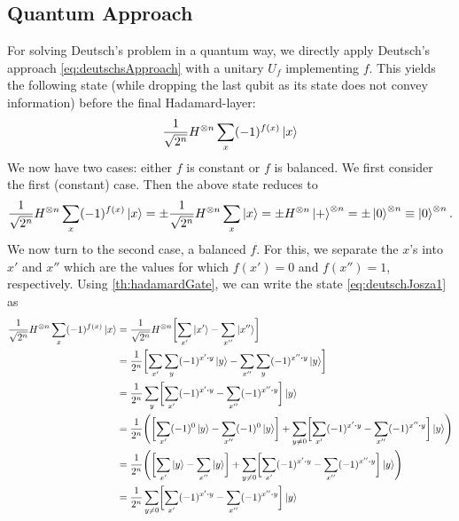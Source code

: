 		\subsection{Quantum Approach}
			For solving Deutsch's problem in a quantum way, we directly apply Deutsch's approach \eqref{eq:deutschsApproach} with a unitary \(U_f\) implementing \(f\). This yields the following state (while dropping the last qubit as its state does not convey information) before the final Hadamard-layer:
			\begin{equation}
				\frac{1}{\sqrt{2^n}} H^{\otimes n} \sum_x (-1)^{f(x)} \ket{x}  \label{eq:deutschJosza1}
			\end{equation}
			We now have two cases: either \(f\) is constant or \(f\) is balanced. We first consider the first (constant) case. Then the above state reduces to
			\begin{equation}
				\frac{1}{\sqrt{2^n}} H^{\otimes n} \sum_x (-1)^{f(x)} \ket{x}
				= \pm \frac{1}{\sqrt{2^n}} H^{\otimes n} \sum_x \ket{x}
				= \pm H^{\otimes n} \ket{+}^{\otimes n}
				= \pm \ket{0}^{\otimes n}
				\equiv \ket{0}^{\otimes n}.
			\end{equation}
			We now turn to the second case, a balanced \(f\). For this, we separate the \(x\)'s into \(x'\) and \(x''\) which are the values for which \(f(x') = 0\) and \(f(x'') = 1\), respectively. Using \eqref{th:hadamardGate}, we can write the state \eqref{eq:deutschJosza1} as
			\begin{align}
				\frac{1}{\sqrt{2^n}} H^{\otimes n} \sum_x (-1)^{f(x)} \ket{x}
				 & = \frac{1}{\sqrt{2^n}} H^{\otimes n} \biggl[ \sum_{x'} \ket{x'} - \sum_{x''} \ket{x''} \biggr]                                                                                                                             \\
				 & = \frac{1}{2^n} \biggl[ \sum_{x'} \sum_y (-1)^{x' \dotproduct y} \ket{y} - \sum_{x''} \sum_y (-1)^{x'' \dotproduct y} \ket{y} \biggr]                                                                                      \\
				 & = \frac{1}{2^n} \sum_y \biggl[ \sum_{x'} (-1)^{x' \dotproduct y} - \sum_{x''} (-1)^{x'' \dotproduct y} \biggr] \ket{y}                                                                                                     \\
				 & = \frac{1}{2^n} \Biggl( \biggl[ \sum_{x'} (-1)^{0} \ket{y} - \sum_{x''} (-1)^{0} \ket{y} \biggr] + \sum_{y \neq 0} \biggl[ \sum_{x'} (-1)^{x' \dotproduct y} - \sum_{x''} (-1)^{x'' \dotproduct y} \biggr] \ket{y} \Biggr) \\
				 & = \frac{1}{2^n} \Biggl( \biggl[ \sum_{x'} \ket{y} - \sum_{x''} \ket{y} \biggr] + \sum_{y \neq 0} \biggl[ \sum_{x'} (-1)^{x' \dotproduct y} - \sum_{x''} (-1)^{x'' \dotproduct y} \biggr] \ket{y} \Biggr)                   \\
				 & = \frac{1}{2^n} \sum_{y \neq 0} \biggl[ \sum_{x'} (-1)^{x' \dotproduct y} - \sum_{x''} (-1)^{x'' \dotproduct y} \biggr] \ket{y}
			\end{align}
